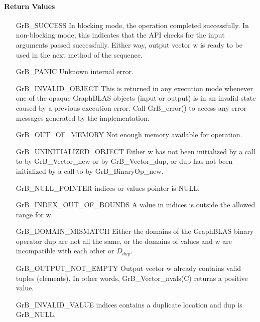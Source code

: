 \paragraph{Return Values}

\begin{itemize}[leftmargin=2.3in]
    \item[{\sf GrB\_SUCCESS}]         In blocking mode, the operation completed
    successfully. In non-blocking mode, this indicates that the API checks 
    for the input arguments passed successfully. Either way, output vector 
    {\sf w} is ready to be used in the next method of the sequence.

    \item[{\sf GrB\_PANIC}]           Unknown internal error.
    
    \item[{\sf GrB\_INVALID\_OBJECT}] This is returned in any execution mode 
    whenever one of the opaque GraphBLAS objects (input or output) is in an invalid 
    state caused by a previous execution error.  Call {\sf GrB\_error()} to access 
    any error messages generated by the implementation.

    \item[{\sf GrB\_OUT\_OF\_MEMORY}] Not enough memory available for operation.
    
    \item[{\sf GrB\_UNINITIALIZED\_OBJECT}]  Either {\sf w} has not been 
    initialized by a call to {\sf by GrB\_Vector\_new} or 
    {\sf by GrB\_Vector\_dup}, or
    {\sf dup} has not been initialized by a call to {\sf by GrB\_BinaryOp\_new}.
    
    \item[{\sf GrB\_NULL\_POINTER}]  {\sf indices} or {\sf values} 
    pointer is {\sf NULL}.

    \item[{\sf GrB\_INDEX\_OUT\_OF\_BOUNDS}] A value in {\sf indices} is outside 
    the allowed range for {\sf w}.
    
	\item[{\sf GrB\_DOMAIN\_MISMATCH}]    Either the domains of the GraphBLAS 
    binary operator {\sf dup} are not all the same, or the domains of 
    {\sf values} and {\sf w} are incompatible with each other or $D_{dup}$.
	
	\item[{\sf GrB\_OUTPUT\_NOT\_EMPTY}]    Output vector {\sf w} already contains valid tuples (elements).
	In other words, {\sf GrB\_Vector\_nvals(C)} returns a positive value.
    
    \item[{\sf GrB\_INVALID\_VALUE}] {\sf indices} contains a duplicate location
    and {\sf dup} is {\sf GrB\_NULL}. 
\end{itemize}

